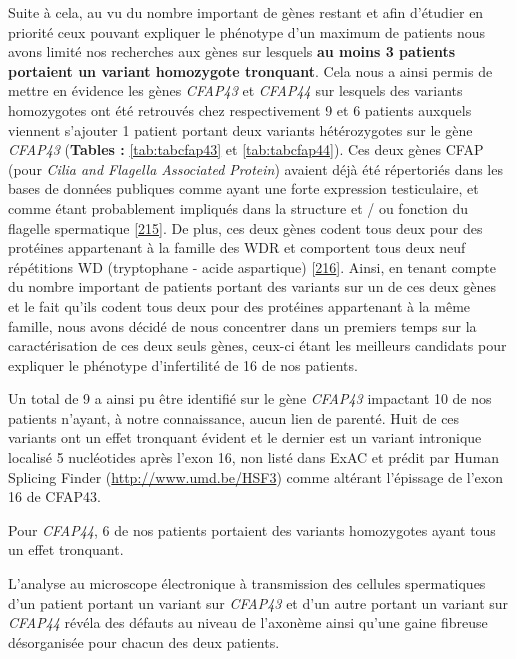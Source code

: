 \documentclass[12pt,a4paper,twoside]{ugathesis}
\theoremstyle{definition}
\theoremstyle{definition}
\theoremstyle{definition}
\theoremstyle{remark}
\begin{document}
Suite à cela, au vu du nombre important de gènes restant et afin
d'étudier en priorité ceux pouvant expliquer le phénotype d'un maximum
de patients nous avons limité nos recherches aux gènes sur lesquels
\textbf{au moins 3 patients portaient un variant homozygote tronquant}.
Cela nous a ainsi permis de mettre en évidence les gènes \emph{CFAP43}
et \emph{CFAP44} sur lesquels des variants homozygotes ont été retrouvés
chez respectivement 9 et 6 patients auxquels viennent s'ajouter 1
patient portant deux variants hétérozygotes sur le gène \emph{CFAP43}
(\textbf{Tables : }\ref{tab:tabcfap43} et \ref{tab:tabcfap44}). Ces deux
gènes CFAP (pour \emph{Cilia and Flagella Associated Protein}) avaient
déjà été répertoriés dans les bases de données publiques comme ayant une
forte expression testiculaire, et comme étant probablement impliqués
dans la structure et / ou fonction du flagelle spermatique
{[}\protect\hyperlink{ref-Ivliev2012}{215}{]}. De plus, ces deux gènes
codent tous deux pour des protéines appartenant à la famille des WDR et
comportent tous deux neuf répétitions WD (tryptophane - acide
aspartique) {[}\protect\hyperlink{ref-Smith2008}{216}{]}. Ainsi, en
tenant compte du nombre important de patients portant des variants sur
un de ces deux gènes et le fait qu'ils codent tous deux pour des
protéines appartenant à la même famille, nous avons décidé de nous
concentrer dans un premiers temps sur la caractérisation de ces deux
seuls gènes, ceux-ci étant les meilleurs candidats pour expliquer le
phénotype d'infertilité de 16 de nos patients.

Un total de 9 a ainsi pu être identifié sur le gène \emph{CFAP43}
impactant 10 de nos patients n'ayant, à notre connaissance, aucun lien
de parenté. Huit de ces variants ont un effet tronquant évident et le
dernier est un variant intronique localisé 5 nucléotides après l'exon
16, non listé dans ExAC et prédit par Human Splicing Finder
(\url{http://www.umd.be/HSF3}) comme altérant l'épissage de l'exon 16 de
CFAP43.

Pour \emph{CFAP44}, 6 de nos patients portaient des variants homozygotes
ayant tous un effet tronquant.

L'analyse au microscope électronique à transmission des cellules
spermatiques d'un patient portant un variant sur \emph{CFAP43} et d'un
autre portant un variant sur \emph{CFAP44} révéla des défauts au niveau
de l'axonème ainsi qu'une gaine fibreuse désorganisée pour chacun des
deux patients.
\end{document}
